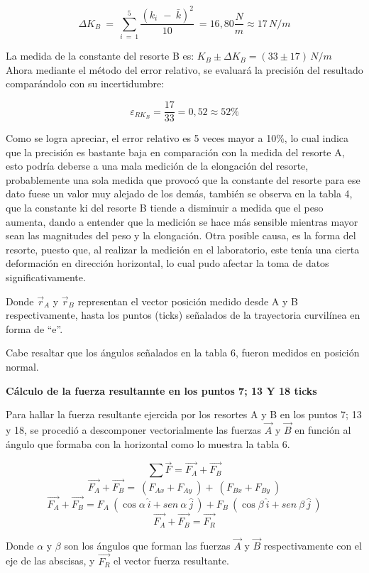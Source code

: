 \documentclass[../main.tex]{subfiles}
\begin{document}
\[\Delta K_B\ =\ \sum_{i\ =\ 1}^{5}\frac{{(k_{i\ }\ -\ \bar{k})}^2}{10}\ =16,80\frac{N}{m}\approx 17 \, N/m\]

La medida de la constante del resorte B es: $K_B \pm \Delta K_B=(33 \pm 17) \, N/m$ \\

Ahora mediante el método del error relativo, se evaluará la precisión del resultado comparándolo con su incertidumbre:

\[\varepsilon_{RK_B}=\frac{17}{33}=0,52\approx52\%\]

Como se logra apreciar, el error relativo es 5 veces mayor a 10\%,
lo cual indica que la precisión es bastante baja en comparación con la
medida del resorte A, esto podría deberse a una mala medición de la elongación
del resorte, probablemente una sola medida que provocó que la constante del 
resorte para ese dato fuese un valor muy alejado de los demás, también se observa
en la tabla 4, que la constante ki del resorte B tiende a disminuir a medida que 
el peso aumenta, dando a entender que la medición se hace más sensible mientras mayor 
sean las magnitudes del peso y la elongación. Otra posible causa, es la forma del resorte,
puesto que, al realizar la medición en el laboratorio, este tenía una cierta deformación 
en dirección horizontal, lo cual pudo afectar la toma de datos significativamente.


Donde $\vec{r}_A$ y $\vec{r}_B$ representan el vector posición medido desde A y B
respectivamente, hasta los puntos (ticks) señalados de la trayectoria curvilínea en
forma de “e”.


Cabe resaltar que los ángulos señalados en la tabla 6, fueron medidos en posición normal.

\textbf{Cálculo de la fuerza resultannte en los puntos 7; 13 Y 18 ticks}

Para hallar la fuerza resultante ejercida por los resortes A y B en los puntos 7; 13 y 18, 
se procedió a descomponer vectorialmente las fuerzas $\vec{A}$ y $\vec{B}$ en función 
al ángulo que formaba con la horizontal como lo muestra la tabla 6.

\[\sum{\vec{F}}= \vec{F_A} + \vec{F_B}\]
\[\vec{F_A}+\vec{F_B}=\ (F_{Ax}+F_{Ay}\ )+\ (F_{Bx}+F_{By}\ )\]
\[\vec{F_A}+\vec{F_B}=F_A\ (\cos{\alpha}\ \hat{i}+sen\ \alpha\ \hat{j}\ )+F_B\ (\cos{\beta}\ \hat{i}+sen\ \beta\ \hat{j}\ )\]
\[\vec{F_A}+\vec{F_B}=\vec{F_R}\]

Donde $\alpha$ y $\beta$ son los ángulos que forman las fuerzas $\vec{A}$ y $\vec{B}$ 
respectivamente con el eje de las abscisas, y $\vec{F_R}$ el vector fuerza resultante.\\
\end{document}
